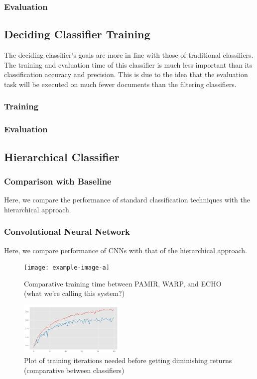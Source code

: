 \subsubsection{Evaluation}

\subsection{Deciding Classifier Training}
The deciding classifier's goals are more in line with those of traditional classifiers. The training and evaluation time of this classifier is much less important than its classification accuracy and precision. This is due to the idea that the evaluation task will be executed on much fewer documents than the filtering classifiers.

\subsubsection{Training}

\subsubsection{Evaluation}


\subsection{Hierarchical Classifier}

\subsubsection{Comparison with Baseline}
Here, we compare the performance of standard classification techniques with the hierarchical approach.

\subsubsection{Convolutional Neural Network}
Here, we compare performance of CNNs with that of the hierarchical approach.

\begin{figure}
    \centering
    \texttt{[image: example-image-a]}
    \caption{Comparative training time between PAMIR, WARP, and ECHO (what we're calling this system?)}
    \label{fig:my-label}
\end{figure}

\begin{figure}
    \centering
    \includegraphics[width=0.45\textwidth]{figures/top-learning-curve.png}
    \caption{Plot of training iterations needed before getting diminishing returns (comparative between classifiers)}
    \label{fig:learning-curve}
\end{figure}

